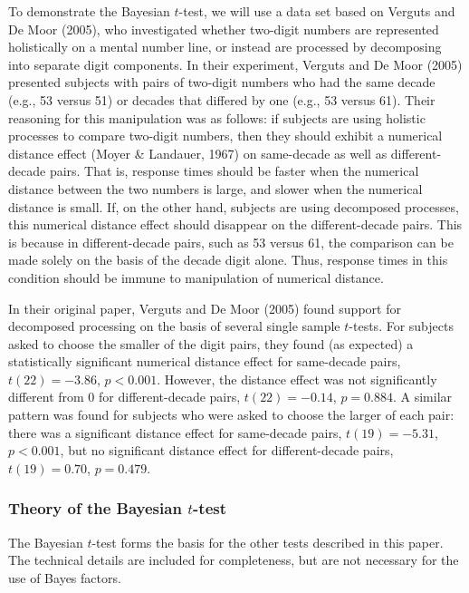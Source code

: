 \documentclass[english,,doc,floatsintext]{apa6}
\begin{document}
To demonstrate the Bayesian \(t\)-test, we will use a data set based on Verguts and De Moor (2005), who investigated whether two-digit numbers are represented holistically on a mental number line, or instead are processed by decomposing into separate digit components. In their experiment, Verguts and De Moor (2005) presented subjects with pairs of two-digit numbers who had the same decade (e.g., 53 versus 51) or decades that differed by one (e.g., 53 versus 61). Their reasoning for this manipulation was as follows: if subjects are using holistic processes to compare two-digit numbers, then they should exhibit a numerical distance effect (Moyer \& Landauer, 1967) on same-decade as well as different-decade pairs. That is, response times should be faster when the numerical distance between the two numbers is large, and slower when the numerical distance is small. If, on the other hand, subjects are using decomposed processes, this numerical distance effect should disappear on the different-decade pairs. This is because in different-decade pairs, such as 53 versus 61, the comparison can be made solely on the basis of the decade digit alone. Thus, response times in this condition should be immune to manipulation of numerical distance.

In their original paper, Verguts and De Moor (2005) found support for decomposed processing on the basis of several single sample \(t\)-tests. For subjects asked to choose the smaller of the digit pairs, they found (as expected) a statistically significant numerical distance effect for same-decade pairs, \(t(22) = -3.86\), \(p<0.001\). However, the distance effect was not significantly different from 0 for different-decade pairs, \(t(22)=-0.14\), \(p=0.884\). A similar pattern was found for subjects who were asked to choose the larger of each pair: there was a significant distance effect for same-decade pairs, \(t(19)=-5.31\), \(p<0.001\), but no significant distance effect for different-decade pairs, \(t(19)=0.70\), \(p=0.479\).

\hypertarget{theory-of-the-bayesian-t-test}{%
\subsubsection{\texorpdfstring{Theory of the Bayesian \(t\)-test}{Theory of the Bayesian t-test}}\label{theory-of-the-bayesian-t-test}}

The Bayesian \(t\)-test forms the basis for the other tests described in this paper. The technical details are included for completeness, but are not necessary for the use of Bayes factors.
\end{document}
